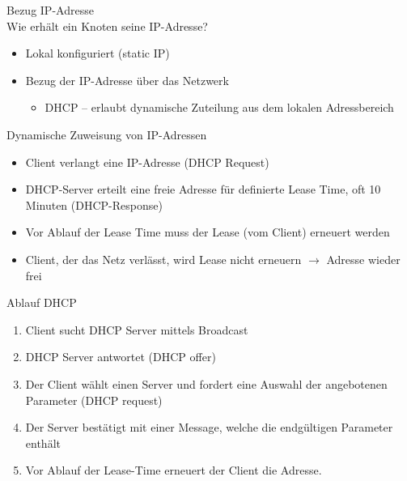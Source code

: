\begin{definition}{Bezug IP-Adresse}\\
    Wie erhält ein Knoten seine IP-Adresse?
    \begin{itemize}
        \item Lokal konfiguriert (static IP)
        \item Bezug der IP-Adresse über das Netzwerk
        \begin{itemize}
            \item DHCP – erlaubt dynamische Zuteilung aus dem lokalen Adressbereich
        \end{itemize}
    \end{itemize}
\end{definition}

\begin{concept}{Dynamische Zuweisung von IP-Adressen}
    \begin{itemize}
        \item Client verlangt eine IP-Adresse (DHCP Request)
        \item DHCP-Server erteilt eine freie Adresse für definierte Lease Time, oft 10 Minuten (DHCP-Response)
        \item Vor Ablauf der Lease Time muss der Lease (vom Client) erneuert werden
        \item Client, der das Netz verlässt, wird Lease nicht erneuern $\rightarrow$ Adresse wieder frei
    \end{itemize}
\end{concept}



\begin{KR}{Ablauf DHCP}
    \begin{enumerate}
        \item Client sucht DHCP Server mittels Broadcast
        \item DHCP Server antwortet (DHCP offer)
        \item Der Client wählt einen Server und fordert eine Auswahl der angebotenen Parameter (DHCP request)
        \item Der Server bestätigt mit einer Message, welche die endgültigen Parameter enthält
        \item Vor Ablauf der Lease-Time erneuert der Client die Adresse.
    \end{enumerate}
\end{KR}

\columnbreak

